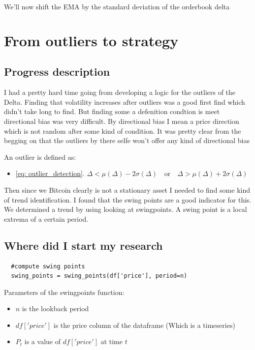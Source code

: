 \documentclass[12pt]{article}
\begin{document}
We'll now shift the EMA by the standard deviation of the orderbook delta 




\newpage
\section*{From outliers to strategy}
\subsection*{Progress description}
I had a pretty hard time going from developing a logic for the outliers of the Delta. Finding that volatility increases after outliers was a good first find which didn't take long to find. But finding some a defenition condtion is meet directional bias was very difficult. By directional bias I mean a price direction which is not random after some kind of condition. It was pretty clear from the begging on that the outliers by there selfe won't offer any kind of directional bias


An outlier is defined as:

\begin{itemize}
  \item \eqref{eq: outlier_detection}.
  $\Delta < \mu(\Delta) - 2\sigma(\Delta) \quad \text{or} \quad \Delta > \mu(\Delta) + 2\sigma(\Delta)    $
\end{itemize}


Then since we Bitcoin clearly is not a stationary asset I needed to find some kind of trend identification. I found that the swing points are a good indicator for this.
We determined a trend by using looking at swingpoints. A swing point is a local extrema of a certain period.

\subsection*{Where did I start my research}
\begin{verbatim}
  #compute swing points
  swing_points = swing_points(df['price'], period=n)

\end{verbatim}

Parameters of the swing\textunderscore points function:
\begin{itemize}
  \item $n$ is the lookback period
  \item $df['price']$ is the price column of the dataframe (Which is a timeseries)
  \item $P_t$ is a value of $df['price']$ at time $t$
\end{itemize}
\end{document}
